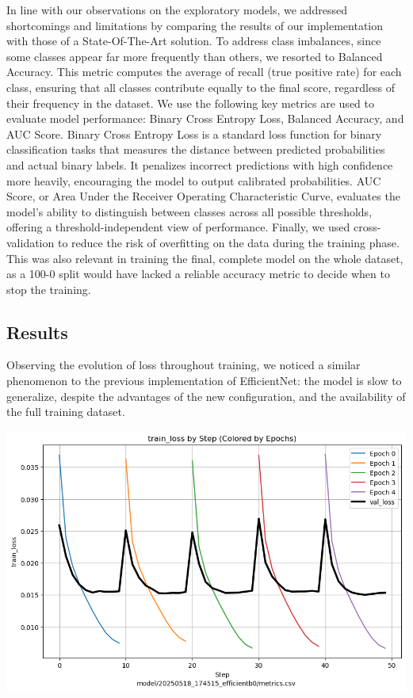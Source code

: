 \documentclass[10pt]{article}
\begin{document}
In line with our observations on the exploratory models, we addressed shortcomings and limitations by comparing the results of our implementation with those of a State-Of-The-Art solution. To address class imbalances, since some classes appear far more frequently than others, we resorted to Balanced Accuracy. This metric computes the average of recall (true positive rate) for each class, ensuring that all classes contribute equally to the final score, regardless of their frequency in the dataset. We use the following key metrics are used to evaluate model performance: Binary Cross Entropy Loss, Balanced Accuracy, and AUC Score. Binary Cross Entropy Loss is a standard loss function for binary classification tasks that measures the distance between predicted probabilities and actual binary labels. It penalizes incorrect predictions with high confidence more heavily, encouraging the model to output calibrated probabilities. AUC Score, or Area Under the Receiver Operating Characteristic Curve, evaluates the model's ability to distinguish between classes across all possible thresholds, offering a threshold-independent view of performance. Finally, we used cross-validation to reduce the risk of overfitting on the data during the training phase. This was also relevant in training the final, complete model on the whole dataset, as a 100-0 split would have lacked a reliable accuracy metric to decide when to stop the training.

\subsection*{Results}

\begin{minipage}{0.55\linewidth}
Observing the evolution of loss throughout training, we noticed a similar phenomenon to the previous implementation of EfficientNet: the model is slow to generalize, despite the advantages of the new configuration, and the availability of the full training dataset.
\end{minipage}
\hfill
\begin{minipage}{0.35\linewidth}
  \includegraphics[width=\linewidth]{img/efficientb_loss_kfold.png}
\end{minipage}
\end{document}
